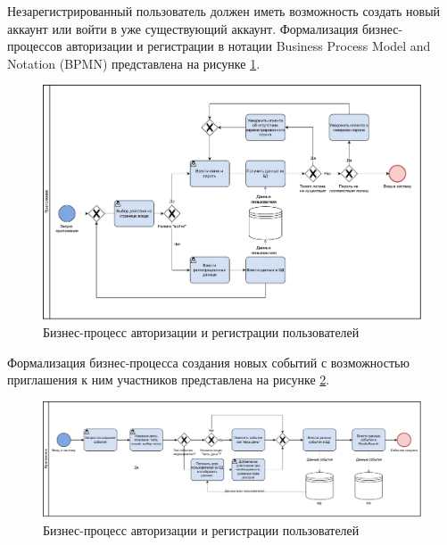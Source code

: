 Незарегистрированный пользователь должен иметь возможность создать новый аккаунт или войти в уже существующий аккаунт. Формализация бизнес-процессов авторизации и регистрации в нотации Business Process Model and Notation (BPMN) представлена на рисунке \ref{fig:BPMN-auth}.

\begin{figure}[ht!]
	\centering
	\includegraphics[width=0.9\linewidth]{assets/images/BPMN-Авторизация.pdf}
	\caption{Бизнес-процесс авторизации и регистрации пользователей}
	\label{fig:BPMN-auth}
\end{figure}

Формализация бизнес-процесса создания новых событий с возможностью приглашения к ним участников представлена на рисунке \ref{fig:BPMN-event}.

\begin{figure}[ht!]
	\centering
	\includegraphics[width=1\linewidth]{assets/images/BPMN-Создание-события.pdf}
	\caption{Бизнес-процесс авторизации и регистрации пользователей}
	\label{fig:BPMN-event}
\end{figure}
